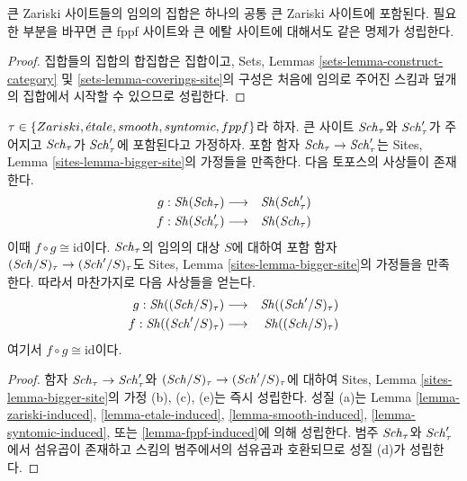 \begin{lemma}
\label{lemma-contained-in}
큰 Zariski 사이트들의 임의의 집합은 하나의 공통 큰 Zariski 사이트에
포함된다. 필요한 부분을 바꾸면 큰 fppf 사이트와 큰 \'에탈 사이트에
대해서도 같은 명제가 성립한다.
\end{lemma}

\begin{proof}
집합들의 집합의 합집합은 집합이고, Sets, Lemmas
\ref{sets-lemma-construct-category} 및
\ref{sets-lemma-coverings-site}의 구성은 처음에 임의로 주어진 스킴과 덮개의
집합에서 시작할 수 있으므로 성립한다.
\end{proof}

\begin{lemma}
\label{lemma-change-alpha}
$\tau \in \{Zariski, {\acute{e}tale}, smooth, syntomic, fppf\}$라 하자. 큰 사이트
$\mathit{Sch}_\tau$와 $\mathit{Sch}'_\tau$가 주어지고 $\mathit{Sch}_\tau$가 $\mathit{Sch}'_\tau$에
포함된다고 가정하자. 포함 함자 $\mathit{Sch}_\tau \to \mathit{Sch}'_\tau$는 Sites,
Lemma \ref{sites-lemma-bigger-site}의 가정들을 만족한다. 다음 토포스의
사상들이 존재한다.
\begin{eqnarray*}
g : \mathop{\mathit{Sh}}\nolimits(\mathit{Sch}_\tau) &
\longrightarrow &
\mathop{\mathit{Sh}}\nolimits(\mathit{Sch}'_\tau) \\
f : \mathop{\mathit{Sh}}\nolimits(\mathit{Sch}'_\tau) &
\longrightarrow &
\mathop{\mathit{Sh}}\nolimits(\mathit{Sch}_\tau)
\end{eqnarray*}
이때 $f \circ g \cong \text{id}$이다. $\mathit{Sch}_\tau$의 임의의 대상 $S$에
대하여 포함 함자 $(\mathit{Sch}/S)_\tau \to (\mathit{Sch}'/S)_\tau$도 Sites, Lemma
\ref{sites-lemma-bigger-site}의 가정들을 만족한다. 따라서 마찬가지로 다음
사상들을 얻는다.
\begin{eqnarray*}
g : \mathop{\mathit{Sh}}\nolimits((\mathit{Sch}/S)_\tau) &
\longrightarrow &
\mathop{\mathit{Sh}}\nolimits((\mathit{Sch}'/S)_\tau) \\
f : \mathop{\mathit{Sh}}\nolimits((\mathit{Sch}'/S)_\tau) &
\longrightarrow &
\mathop{\mathit{Sh}}\nolimits((\mathit{Sch}/S)_\tau)
\end{eqnarray*}
여기서 $f \circ g \cong \text{id}$이다.
\end{lemma}

\begin{proof}
함자 $\mathit{Sch}_\tau \to \mathit{Sch}'_\tau$와
$(\mathit{Sch}/S)_\tau \to (\mathit{Sch}'/S)_\tau$에 대하여 Sites, Lemma
\ref{sites-lemma-bigger-site}의 가정 (b), (c), (e)는 즉시 성립한다. 성질
(a)는 Lemma \ref{lemma-zariski-induced},
\ref{lemma-etale-induced},
\ref{lemma-smooth-induced},
\ref{lemma-syntomic-induced}, 또는
\ref{lemma-fppf-induced}에 의해 성립한다. 범주 $\mathit{Sch}_\tau$와
$\mathit{Sch}'_\tau$에서 섬유곱이 존재하고 스킴의 범주에서의 섬유곱과 호환되므로
성질 (d)가 성립한다.
\end{proof}

